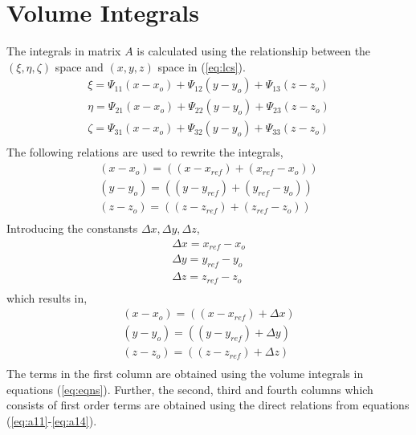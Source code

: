 \section*{Volume Integrals}\label{sec:vi}
The integrals in matrix $A$ is calculated using the relationship between the $(\xi,\eta,\zeta)$ space and $(x,y,z)$ space in (\ref{eq:lcs}).
\begin{equation}
    \label{eq:a11}
    \begin{gathered}
    \xi=\Psi_{11}(x-x_o)+\Psi_{12}(y-y_o)+\Psi_{13}(z-z_o)\\
    \eta=\Psi_{21}(x-x_o)+\Psi_{22}(y-y_o)+\Psi_{23}(z-z_o)\\
    \zeta=\Psi_{31}(x-x_o)+\Psi_{32}(y-y_o)+\Psi_{33}(z-z_o)\\
    \end{gathered}
\end{equation}
The following relations are used to rewrite the integrals,
\begin{equation}
    \label{eq:a12}
    \begin{gathered}
    (x-x_o)=((x-x_{ref})+(x_{ref}-x_o))\\
    (y-y_o)=((y-y_{ref})+(y_{ref}-y_o))\\
    (z-z_o)=((z-z_{ref})+(z_{ref}-z_o))\\
    \end{gathered}
\end{equation}
Introducing the constansts $\Delta x,\Delta y,\Delta z$,
\begin{equation}
    \label{eq:a13}
    \begin{gathered}
    \Delta x=x_{ref}-x_o\\
    \Delta y=y_{ref}-y_o\\
    \Delta z=z_{ref}-z_o\\
    \end{gathered}
\end{equation}
which results in,
\begin{equation}
    \label{eq:a14}
    \begin{gathered}
    (x-x_o)=((x-x_{ref})+\Delta x)\\
    (y-y_o)=((y-y_{ref})+\Delta y)\\
    (z-z_o)=((z-z_{ref})+\Delta z)\\
    \end{gathered}
\end{equation}
The terms in the first column are obtained using the volume integrals in equations (\ref{eq:eqns}). Further, the second, third and fourth columns which consists of first order terms are obtained using the direct relations from equations (\ref{eq:a11}-\ref{eq:a14}).
